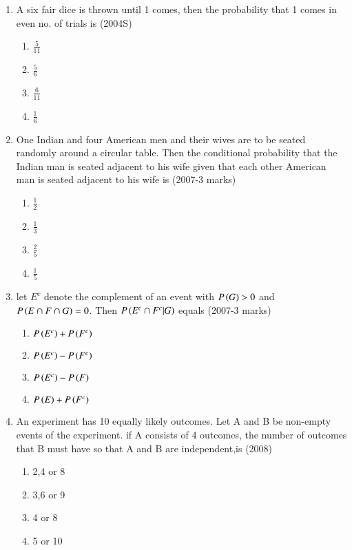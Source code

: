 \documentclass[journal,12pt,twocolumn]{IEEEtran}
\theoremstyle{remark}
\begin{document}
\begin{enumerate}[start=16]
\begin{multicols}{4}
\end{multicols}
\item A six fair dice is thrown until 1 comes, then the probability that 1 comes in even no. of trials is \hfill (2004S)
\begin{multicols}{4}
\begin{enumerate}
    \item $\frac{5}{11}$
    \item $\frac{5}{6}$
    \item $\frac{6}{11}$
    \item $\frac{1}{6}$
\end{enumerate}
\end{multicols}
\item One Indian and four American men and their wives are to be seated randomly around a circular table. Then the conditional probability that the Indian man is seated adjacent to his wife given that each other American man is seated adjacent to his wife is \hfill(2007-3 marks)
\begin{multicols}{4}
\begin{enumerate}
    \item $\frac{1}{2}$
    \item $\frac{1}{3}$
    \item $\frac{2}{5}$
    \item $\frac{1}{5}$
\end{enumerate}
\end{multicols}
\item let $E^{c}$ denote the complement of an event with $P\left(G\right)>0$ and $P\left(E\cap F\cap G\right)=0$. Then $P\left(E^{c}\cap F^{c}|G\right)$ equals \hfill (2007-3 marks)
\begin{multicols}{2}
\begin{enumerate}
    \item $P\left(E^{c}\right)+P\left(F^{c}\right)$
    \item $P\left(E^{c}\right)-P\left(F^{c}\right)$
    \item $P\left(E^{c}\right)-P\left(F\right)$
    \item $P\left(E\right)+P\left(F^{c}\right)$    
\end{enumerate}
\end{multicols}
\item An experiment has 10 equally likely outcomes. Let A and B be non-empty events of the experiment. if A consists of 4 outcomes, the number of outcomes that B must have so that A and B are independent,is \hfill (2008)
\begin{multicols}{2}
\begin{enumerate}
    \item 2,4 or 8
    \item 3,6 or 9
    \item 4 or 8
    \item 5 or 10
\end{enumerate}
    

\end{multicols}
\end{enumerate}
\end{document}
